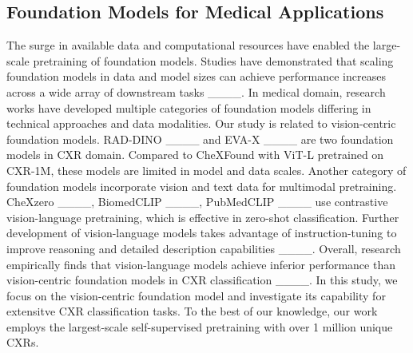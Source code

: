 \subsection{Foundation Models for Medical Applications}
The surge in available data and computational resources have enabled the large-scale pretraining of foundation models. Studies have demonstrated that scaling foundation models in data and model sizes can achieve performance increases across a wide array of downstream tasks ____. In medical domain, research works have developed multiple categories of foundation models differing in technical approaches and data modalities. Our study is related to vision-centric foundation models. RAD-DINO ____ and EVA-X ____ are two foundation models in CXR domain. Compared to CheXFound with ViT-L pretrained on CXR-1M, these models are limited in model and data scales. 
Another category of foundation models incorporate vision and text data for multimodal pretraining. CheXzero ____, BiomedCLIP ____, PubMedCLIP ____ use contrastive vision-language pretraining, which is effective in zero-shot classification. Further development of vision-language models takes advantage of instruction-tuning to improve reasoning and detailed description capabilities ____. Overall, research empirically finds that vision-language models achieve inferior performance than vision-centric foundation models in CXR classification ____. In this study, we focus on the vision-centric foundation model and investigate its capability for extensitve CXR classification tasks.
To the best of our knowledge, our work employs the largest-scale self-supervised pretraining with over 1 million unique CXRs.

